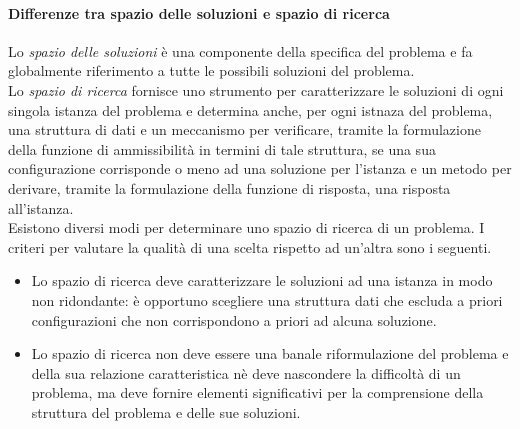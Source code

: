 \documentclass[12pt]{report}
\begin{document}
   \paragraph{Differenze tra spazio delle soluzioni e spazio di ricerca} Lo \textit{spazio delle soluzioni} è una componente della specifica del problema e fa globalmente riferimento a tutte le possibili soluzioni del problema. \\
   Lo \textit{spazio di ricerca} fornisce uno strumento per caratterizzare le soluzioni di ogni singola istanza del problema e determina anche, per ogni istnaza del problema, una struttura di dati e un meccanismo per verificare, tramite la formulazione della funzione di ammissibilità in termini di tale struttura, se una sua configurazione corrisponde o meno ad una soluzione per l'istanza e un metodo per derivare, tramite la formulazione della funzione di risposta, una risposta all'istanza. \\
   Esistono diversi modi per determinare uno spazio di ricerca di un problema. I criteri per valutare la qualità di una scelta rispetto ad un'altra sono i seguenti.
   \begin{itemize}
   	\item Lo spazio di ricerca deve caratterizzare le soluzioni ad una istanza in modo non ridondante: è opportuno scegliere una struttura dati che escluda a priori configurazioni che non corrispondono a priori ad alcuna soluzione.
   	\item Lo spazio di ricerca non deve essere una banale riformulazione del problema e della sua relazione caratteristica nè deve nascondere la difficoltà di un problema, ma deve fornire elementi significativi per la comprensione della struttura del problema e delle sue soluzioni.
   \end{itemize}
\end{document}
